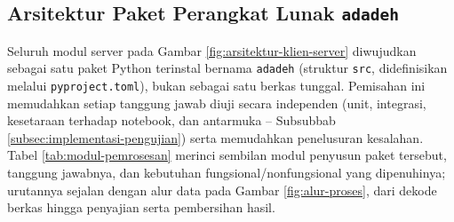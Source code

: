 \subsection{Arsitektur Paket Perangkat Lunak \texttt{adadeh}}
\label{subsec:arsitektur-modul-pemrosesan}

Seluruh modul server pada Gambar \ref{fig:arsitektur-klien-server} diwujudkan
sebagai satu paket Python terinstal bernama \texttt{adadeh} (struktur
\texttt{src}, didefinisikan melalui \texttt{pyproject.toml}), bukan sebagai
satu berkas tunggal. Pemisahan ini memudahkan setiap tanggung jawab diuji
secara independen (unit, integrasi, kesetaraan terhadap notebook, dan
antarmuka -- Subsubbab \ref{subsec:implementasi-pengujian}) serta memudahkan
penelusuran kesalahan. Tabel \ref{tab:modul-pemrosesan} merinci sembilan modul
penyusun paket tersebut, tanggung jawabnya, dan kebutuhan fungsional/nonfungsional
yang dipenuhinya; urutannya sejalan dengan alur data pada Gambar
\ref{fig:alur-proses}, dari dekode berkas hingga penyajian serta pembersihan
hasil.

